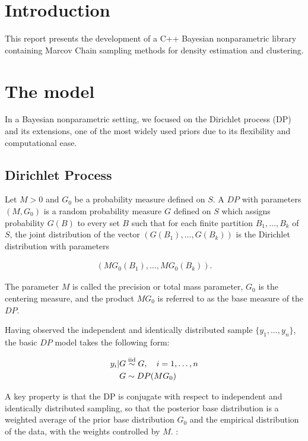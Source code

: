
 
 
\section{Introduction}
This report presents the development of a C++ Bayesian nonparametric library containing Marcov Chain sampling methods for density estimation and clustering. 


\section{The model}

In a Bayesian nonparametric setting, we focused on the Dirichlet process (DP) and its extensions, one of the most widely used priors due to its flexibility and computational ease.


\subsection{Dirichlet Process}
Let $M>0$ and $G_0$ be a probability measure defined on $S$. A $DP$ with parameters $(M,G_0)$ is a random probability measure $G$ defined on $S$ which assigns probability $G(B)$ to every set $B$ such that for each finite partition ${B_1,\dots,B_k}$ of $S$, the joint distribution of the  vector $(G(B_1),\dots,G(B_k))$ is the Dirichlet distribution with parameters 

\begin{align*}
(MG_0(B_1),\dots,MG_0(B_k)).
\end{align*}

The parameter $M$ is called the precision or total mass parameter, $G_0$ is
the centering measure, and the product $MG_0$ is referred to as the base measure
of the $DP$.

Having observed the independent and identically distributed sample $\{y_1,\dots,y_n\}$, the basic $DP$ model takes the following form:

\begin{align}
		y_i | G &\stackrel{\text{iid}}{\sim} G, \quad i=1,\dots,n \\
		G &\sim DP(MG_0) \nonumber
\end{align}



A key property is that the DP is conjugate with respect to independent and identically distributed sampling, so that
the posterior base distribution is a weighted average of the prior base distribution $G_0$ and the empirical distribution of the data, with the weights controlled by $M$.  :

